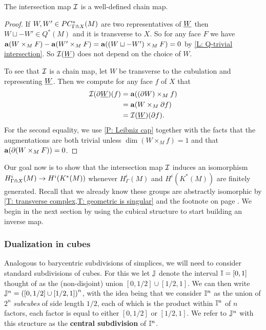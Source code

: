 \begin{proposition}
The intersection map $\mathcal{I}$ is a well-defined chain map.
\end{proposition}
\begin{proof}
If $W, W' \in PC^*_{\Gamma\pitchfork X}(M)$ are two representatives of $\underline{W}$ then $W \sqcup -W' \in Q^*(M)$ and it is transverse to $X$. So for any face $F$ we have $\mathbf{a}(W \times_M F)-\mathbf{a}(W' \times_M F) = \mathbf{a}((W \sqcup -W') \times_M F) = 0$ by \cref{L: Q-trivial intersection}. So $\mathcal{I}(\underline{W})$ does not depend on the choice of $W$.

To see that $\mathcal{I}$ is a chain map, let $W$ be transverse to the cubulation and representing $\underline{W}$. Then we compute for any face $f$ of $X$ that
\begin{align*}
\mathcal{I}(\partial\underline{W})(f)& = \mathbf{a}((\partial W) \times_M f)\\
& = \mathbf{a}(W \times_M \partial f)\\
& = \mathcal{I}(\underline{W})(\partial f).
\end{align*}
For the second equality, we use \cref{P: Leibniz cap} together with the facts that the augmentations are both trivial unless $\dim(W \times_M f) = 1$ and that $\mathbf{a}(\partial (W \times_M F)) = 0$.
\end{proof}



Our goal now is to show that the intersection map $\mathcal{I}$ induces an isomorphism $H^i_{\Gamma \pitchfork X}(M) \to H^i(K^*(M))$ whenever $H^i_\Gamma(M)$ and $H^i(K^*(M))$ are finitely generated. Recall that we already know these groups are abstractly isomorphic by \cref{T: transverse complex,T: geometric is singular} and the footnote on page \pageref{FN: cubical and singular}. We begin in the next section by using the cubical structure to start building an inverse map.



\subsubsection{Dualization in cubes}\label{S: dual cubes}







Analogous to barycentric subdivisions of simplices, we will need to consider standard subdivisions of cubes. For this we let $\mathbb{J}$ denote the interval $\mathbb{I} = [0,1]$ thought of as the (non-disjoint) union $[0,1/2] \cup [1/2,1]$. We can then write $\mathbb{J}^n = \left([0,1/2] \cup [1/2,1]\right)^n$, with the idea being that we consider $\mathbb{I}^n$ as the union of $2^n$ \textit{subcubes} of side length $1/2$, each of which is the product within $\mathbb{I}^n$ of $n$ factors, each factor is equal to either $[0,1/2]$ or $[1/2,1]$. We refer to $\mathbb{J}^n$ with this structure as the \textbf{central subdivision} of $\mathbb{I}^n$.

